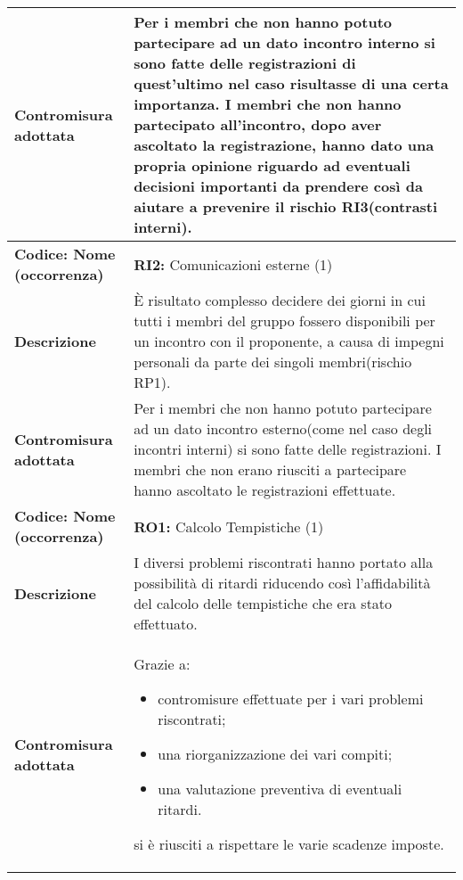 {\begin{longtable}{C{3.5cm} | C{11cm}}
\textbf{Contromisura adottata} & Per i membri che non hanno potuto partecipare ad un dato incontro interno si sono fatte delle registrazioni di quest'ultimo nel caso risultasse di una certa importanza. I membri che non hanno partecipato all'incontro, dopo aver ascoltato la registrazione, hanno dato una propria opinione riguardo ad eventuali decisioni importanti da prendere così da aiutare a prevenire il rischio RI3(contrasti interni).\\
\hline
\hline
{}\textbf{Codice: Nome (occorrenza)} & \textbf{RI2: }{Comunicazioni esterne (1)}\\ 
\textbf{Descrizione} & È risultato complesso decidere dei giorni in cui tutti i membri del gruppo fossero disponibili per un incontro con il proponente, a causa di impegni personali da parte dei singoli membri(rischio RP1).\\ 
\textbf{Contromisura adottata} & Per i membri che non hanno potuto partecipare ad un dato incontro esterno(come nel caso degli incontri interni) si sono fatte delle registrazioni. I membri che non erano riusciti a partecipare hanno ascoltato le registrazioni effettuate.\\
\hline
\hline
{}\textbf{Codice: Nome (occorrenza)} & \textbf{RO1: }{Calcolo Tempistiche (1)}\\
\textbf{Descrizione} & I diversi problemi riscontrati hanno portato alla possibilità di ritardi riducendo così l'affidabilità del calcolo delle tempistiche che era stato effettuato.\\
\textbf{Contromisura adottata} & Grazie a: 
\begin{itemize}
\item contromisure effettuate per i vari problemi riscontrati;
\item una riorganizzazione dei vari compiti;
\item una valutazione preventiva di eventuali ritardi.
\end{itemize} 
si è riusciti a rispettare le varie scadenze imposte.\\
\hline
\hline
\end{longtable}
}